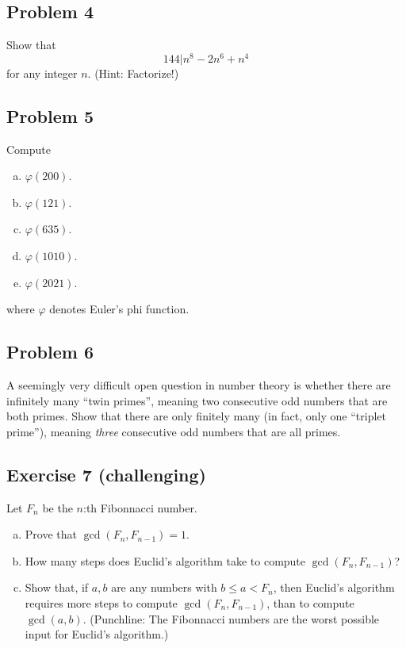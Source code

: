 \documentclass{amsart}
\theoremstyle{definition} \newtheorem*{definition}{Definition}
\theoremstyle{remark} \newtheorem*{ex}{Example}
\begin{document}
\subsection*{Problem 4}
Show that $$144|n^8-2n^6+n^4$$ for any integer $n$. (Hint: Factorize!)

\subsection*{Problem 5}
Compute 
\begin{enumerate}[a)]\item$\varphi(200)$.
\item$\varphi(121)$.
\item$\varphi(635)$.
\item$\varphi(1010)$.
\item$\varphi(2021)$.
\end{enumerate}
where $\varphi$ denotes Euler's phi function.

\subsection*{Problem 6}
A seemingly very difficult open question in number theory is whether there are infinitely many ``twin primes'', meaning two consecutive odd numbers that are both primes. Show that there are only finitely many (in fact, only one ``triplet prime''), meaning {\em three} consecutive odd numbers that are all primes.

\subsection*{Exercise 7 (challenging)}
Let $F_n$ be the $n$:th Fibonnacci number. 
\begin{enumerate}[a)]
\item Prove that $\gcd(F_{n}, F_{n-1})=1$.
\item How many steps does Euclid's algorithm take to compute $\gcd(F_n, F_{n-1})$?
\item Show that, if $a,b$ are any numbers with $b\leq a< F_n$, then Euclid's algorithm requires more steps to compute $\gcd(F_n, F_{n-1})$, than to compute $\gcd(a,b)$. (Punchline: The Fibonnacci numbers are the worst possible input for Euclid's algorithm.)
\end{enumerate}
\end{document}
